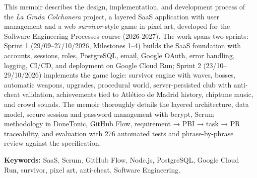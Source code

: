 This memoir describes the design, implementation, and development process of the \textit{La Grada Colchonera} project, a layered SaaS application with user management and a web \textit{survivor}-style game in pixel art, developed for the Software Engineering Processes course (2026-2027). The work spans two sprints: Sprint 1 (29/09–27/10/2026, Milestones 1–4) builds the SaaS foundation with accounts, sessions, roles, PostgreSQL, email, Google OAuth, error handling, logging, CI/CD, and deployment on Google Cloud Run; Sprint 2 (23/10–29/10/2026) implements the game logic: survivor engine with waves, bosses, automatic weapons, upgrades, procedural world, server-persisted club with anti-cheat validation, achievements tied to Atlético de Madrid history, chiptune music, and crowd sounds. The memoir thoroughly details the layered architecture, data model, secure session and password management with bcrypt, Scrum methodology in DoneTonic, GitHub Flow, requirement → PBI → task → PR traceability, and evaluation with 276 automated tests and phrase-by-phrase review against the specification.

\medskip
\noindent\textbf{Keywords:} SaaS, Scrum, GitHub Flow, Node.js, PostgreSQL, Google Cloud Run, survivor, pixel art, anti-cheat, Software Engineering.
